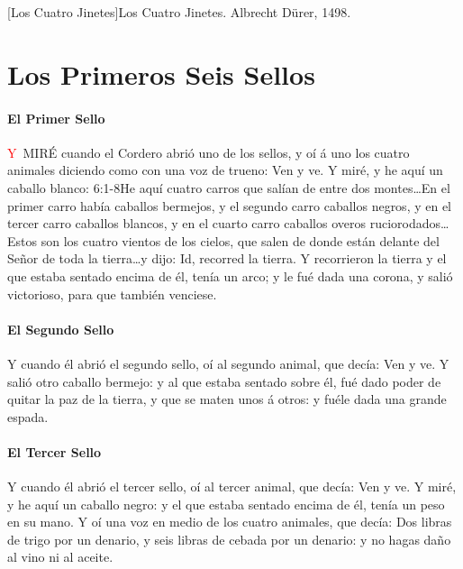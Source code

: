 [Los Cuatro Jinetes]{Los Cuatro Jinetes. Albrecht Dürer, 1498.}

\chapter{Los Primeros Seis Sellos}
\subsubsection*{El Primer Sello}
\lettrine[lines=3]{\textcolor{red}{Y}}{\ MIRÉ} cuando el Cordero abrió uno de los sellos, y oí á uno los cuatro animales diciendo como con una voz de trueno: Ven y ve. 
Y miré, y he aquí un caballo blanco:%
					{6:1-8}{He aquí cuatro carros que salían de entre dos montes\ldots En el primer carro había caballos bermejos, y el segundo carro caballos negros, y en el tercer carro caballos blancos, y en el cuarto carro caballos overos ruciorodados\ldots Estos son los cuatro vientos de los cielos, que salen de donde están delante del Señor de toda la tierra\ldots y dijo: Id, recorred la tierra. Y recorrieron la tierra}
 y el que estaba sentado encima de él, tenía un arco; y le fué dada una corona, y salió victorioso, para que también venciese.
\subsubsection*{El Segundo Sello}
Y cuando él abrió el segundo sello, oí al segundo animal, que decía: Ven y ve. %
Y salió otro caballo bermejo: y al que estaba sentado sobre él, fué dado poder de quitar la paz de la tierra, y que se maten unos á otros: y fuéle dada una grande espada.
\subsubsection*{El Tercer Sello}
Y cuando él abrió el tercer sello, oí al tercer animal, que decía: Ven y ve. Y miré, y he aquí un caballo negro: y el que estaba sentado encima de él, tenía un peso en su mano. %
Y oí una voz en medio de los cuatro animales, que decía: Dos libras de trigo por un denario, y seis libras de cebada por un denario: y no hagas daño al vino ni al aceite.

